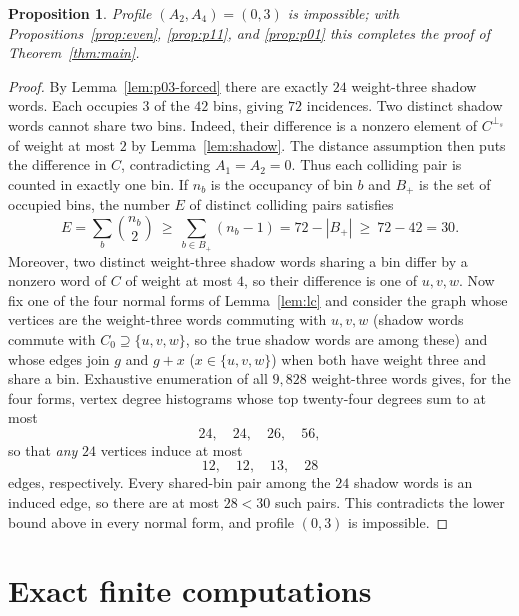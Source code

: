 \documentclass[11pt]{amsart}
\newtheorem{proposition}[theorem]{Proposition}
\theoremstyle{definition}
\theoremstyle{remark}
\newcommand{\perps}{{\perp_s}}
\begin{document}
\begin{proposition}\label{prop:p03}
Profile $(A_2,A_4)=(0,3)$ is impossible; with
Propositions~\ref{prop:even}, \ref{prop:p11}, and \ref{prop:p01} this
completes the proof of Theorem~\ref{thm:main}.
\end{proposition}

\begin{proof}
By Lemma~\ref{lem:p03-forced} there are exactly $24$ weight-three shadow
words.  Each occupies $3$ of the $42$ bins, giving $72$ incidences.  Two
distinct shadow words cannot share two bins.  Indeed, their difference is a
nonzero element of $C^{\perps}$ of weight at most $2$ by
Lemma~\ref{lem:shadow}.  The distance assumption then puts the difference in
$C$, contradicting $A_1=A_2=0$.  Thus each colliding pair is counted in
exactly one bin.  If $n_b$ is the occupancy of bin $b$ and $B_+$ is the set
of occupied bins, the number $E$ of distinct colliding pairs satisfies
\[
E=\sum_b\binom{n_b}{2}
\ \ge\ \sum_{b\in B_+}(n_b-1)
=72-|B_+|\ \ge\ 72-42=30 .
\]
Moreover, two distinct weight-three shadow words sharing a bin differ by a
nonzero word of $C$ of weight at most $4$, so their difference is one of
$u,v,w$.  Now fix one of the four normal forms of
Lemma~\ref{lem:lc} and consider the graph whose vertices are the
weight-three words commuting with $u,v,w$ (shadow words commute with
$C_0\supseteq\{u,v,w\}$, so the true shadow words are among these) and
whose edges join $g$ and $g+x$ ($x\in\{u,v,w\}$) when both have weight
three and share a bin.  Exhaustive enumeration of all $9{,}828$ weight-three
words gives, for the four forms, vertex
degree histograms whose top twenty-four degrees sum to at most
\[
24,\quad 24,\quad 26,\quad 56 ,
\]
so that \emph{any} $24$ vertices induce at most
\[
12,\quad 12,\quad 13,\quad 28
\]
edges, respectively.  Every shared-bin pair among the $24$ shadow words is
an induced edge, so there are at most $28<30$ such pairs.  This
contradicts the lower bound above in every normal form, and profile
$(0,3)$ is impossible.
\end{proof}

\section{Exact finite computations}\label{sec:verification}
\end{document}
